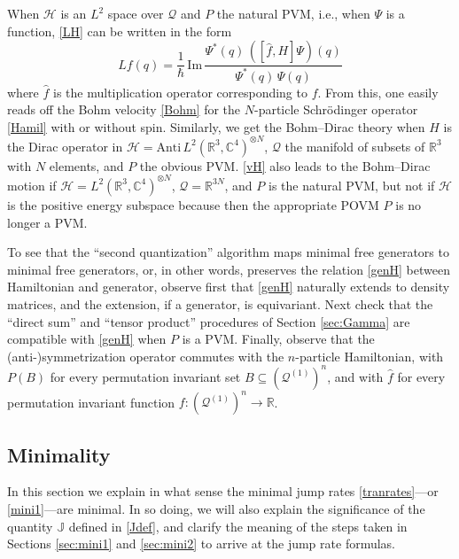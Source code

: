 \documentclass[12pt]{article}
\newcommand{\CCC}{\mathbb{C}} %
\newcommand{\RRR}{\mathbb{R}} %
\newcommand{\1}{\mathbf{1}} %
\renewcommand{\Im}{\mathrm{Im}} %
\newcommand{\Anti}{{\mathrm{Anti}\,}} %
\newcommand{\Hilbert}{\mathscr{H}}
\newcommand{\conf}{\mathcal{Q}} %
\newcommand{\current}{\mathbb{J}}
\newcommand{\pov}{{P}}%
\begin{document}
When $\Hilbert$ is an $L^2$ space over $\conf$ and $\pov$ the natural
PVM, i.e., when $\Psi$ is a function, \eqref{LH} can be written in the
form
\begin{equation}\label{vH}
   L f(q)= \frac{1}{\hbar}\, \Im \, \frac{\Psi^*(q) \,
   ([\hat{f},H]\Psi)(q)} {\Psi^*(q) \, \Psi(q)}
\end{equation}
where $\hat{f}$ is the multiplication operator corresponding to $f$.
{}From this, one easily reads off the Bohm velocity \eqref{Bohm} for the
$N$-particle Schr\"odinger operator \eqref{Hamil} with or without
spin.  Similarly, we get the Bohm--Dirac theory when $H$ is the Dirac
operator in $\Hilbert = \Anti L^2(\RRR^3,\CCC^4)^{\otimes N}$, $\conf$
the manifold of subsets of $\RRR^3$ with $N$ elements, and $\pov$ the
obvious PVM.  \eqref{vH} also leads to the Bohm--Dirac motion if
$\Hilbert = L^2(\RRR^3,\CCC^4)^{\otimes N}$, $\conf = \RRR^{3N}$, and
$\pov$ is the natural PVM, but not if $\Hilbert$ is the positive
energy subspace because then the appropriate POVM $\pov$ is no longer
a PVM.

To see that the ``second quantization'' algorithm maps minimal free
generators to minimal free generators, or, in other words, preserves
the relation \eqref{genH} between Hamiltonian and generator, observe
first that \eqref{genH} naturally extends to density matrices, and the
extension, if a generator, is equivariant. Next check that the
``direct sum'' and ``tensor product'' procedures of Section
\ref{sec:Gamma} are compatible with \eqref{genH} when $\pov$ is a PVM.
Finally, observe that the (anti\nobreakdash-)symmetrization operator
commutes with the $n$-particle Hamiltonian, with $\pov(B)$ for every
permutation invariant set $B \subseteq (\conf^{(1)})^n$, and with
$\hat{f}$ for every permutation invariant function $f:(\conf^{(1)})^n
\to \RRR$.



\subsection{Minimality}
\label{sec:mini4}

In this section we explain in what sense the minimal jump rates
\eqref{tranrates}---or \eqref{mini1}---are minimal.  In so doing, we
will also explain the significance of the quantity $\current$ defined
in \eqref{Jdef}, and clarify the meaning of the steps taken in
Sections \ref{sec:mini1} and \ref{sec:mini2} to arrive at the jump
rate formulas.
\end{document}
